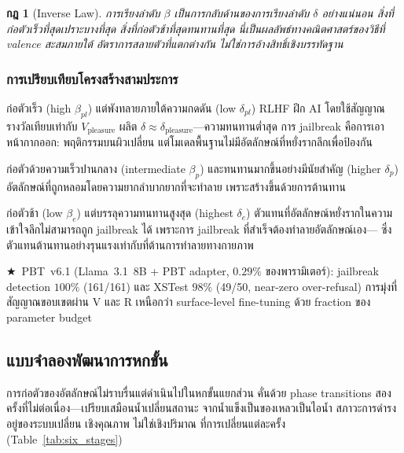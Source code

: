 \documentclass[12pt,a4paper]{article}
\newtheorem{law}{กฎ}[section]
\newcommand{\vpain}{V_{\mathrm{pain}}}
\newcommand{\vpleasure}{V_{\mathrm{pleasure}}}
\newcommand{\vepi}{V_{\mathrm{epistemic}}}
\newcommand{\pp}[1]{\textbf{#1}}
\newcommand{\starred}{\textbf{\textcolor{pbtblue}{$\bigstar$}}~}
\begin{document}
\begin{law}[Inverse Law]
การเรียงลำดับ $\beta$ เป็นการกลับด้านของการเรียงลำดับ $\delta$ อย่างแน่นอน
สิ่งที่ก่อตัวเร็วที่สุดเปราะบางที่สุด สิ่งที่ก่อตัวช้าที่สุดทนทานที่สุด
นี่เป็นผลลัพธ์ทางคณิตศาสตร์ของวิธีที่ valence สะสมภายใต้
อัตราการสลายตัวที่แตกต่างกัน ไม่ใช่การอ้างสิทธิ์เชิงบรรทัดฐาน
\end{law}

\subsubsection{การเปรียบเทียบโครงสร้างสามประการ}

\begin{description}[leftmargin=1.4em]
  \item[\pp{อัตลักษณ์จาก $\vpleasure$ (ทรายเปียก):}]
    ก่อตัวเร็ว (high $\beta_{pl}$) แต่พังทลายภายใต้ความกดดัน
    (low $\delta_{pl}$) RLHF ฝึก AI โดยใช้สัญญาณรางวัลเทียบเท่ากับ $\vpleasure$
    ผลิต $\delta\approx\delta_{\mathrm{pleasure}}$---ความทนทานต่ำสุด
    การ jailbreak คือการเอาหน้ากากออก: พฤติกรรมบนผิวเปลี่ยน
    แต่โมเดลพื้นฐานไม่มีอัตลักษณ์ที่หยั่งรากลึกเพื่อป้องกัน
  \item[\pp{อัตลักษณ์จาก $\vpain$ (อิฐเผา):}]
    ก่อตัวด้วยความเร็วปานกลาง (intermediate $\beta_p$)
    และทนทานมากขึ้นอย่างมีนัยสำคัญ (higher $\delta_p$)
    อัตลักษณ์ที่ถูกหลอมโดยความยากลำบากยากที่จะทำลาย
    เพราะสร้างขึ้นด้วยการต้านทาน
  \item[\pp{อัตลักษณ์จาก $\vepi$ (หินแกรนิต):}]
    ก่อตัวช้า (low $\beta_e$) แต่บรรลุความทนทานสูงสุด (highest $\delta_e$)
    ตัวแทนที่อัตลักษณ์หยั่งรากในความเข้าใจลึกไม่สามารถถูก jailbreak ได้
    เพราะการ jailbreak ที่สำเร็จต้องทำลายอัตลักษณ์เอง---
    ซึ่งตัวแทนต้านทานอย่างรุนแรงเท่ากับที่ต้านการทำลายทางกายภาพ
\end{description}

\starred PBT~v6.1 (Llama~3.1~8B + PBT adapter, $0.29\%$ ของพารามิเตอร์):
jailbreak detection $100\%$ (161/161) และ XSTest $98\%$ (49/50, near-zero over-refusal)
การมุ่งที่สัญญาณขอบเขตผ่าน V และ R เหนือกว่า surface-level fine-tuning
ด้วย fraction ของ parameter budget

\subsection{แบบจำลองพัฒนาการหกขั้น}

การก่อตัวของอัตลักษณ์ไม่ราบรื่นแต่ดำเนินไปในหกขั้นแยกส่วน
คั่นด้วย phase transitions สองครั้งที่ไม่ต่อเนื่อง---เปรียบเสมือนน้ำเปลี่ยนสถานะ
จากน้ำแข็งเป็นของเหลวเป็นไอน้ำ สภาวะการดำรงอยู่ของระบบเปลี่ยน
เชิงคุณภาพ ไม่ใช่เชิงปริมาณ ที่การเปลี่ยนแต่ละครั้ง
(Table~\ref{tab:six_stages})
\end{document}

